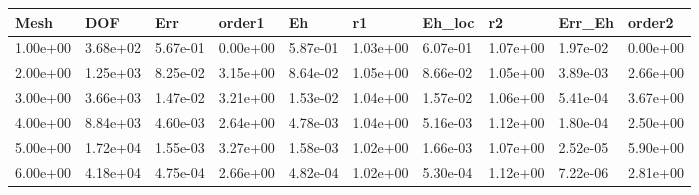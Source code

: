 \begin{tabular}{llllllllll}
Mesh & DOF & Err & order1 & Eh & r1 & Eh_loc & r2 & Err_Eh & order2 \\ 
\hline 
1.00e+00 & 3.68e+02 & 5.67e-01 & 0.00e+00 & 5.87e-01 & 1.03e+00 & 6.07e-01 & 1.07e+00 & 1.97e-02 & 0.00e+00 \\ 
2.00e+00 & 1.25e+03 & 8.25e-02 & 3.15e+00 & 8.64e-02 & 1.05e+00 & 8.66e-02 & 1.05e+00 & 3.89e-03 & 2.66e+00 \\ 
3.00e+00 & 3.66e+03 & 1.47e-02 & 3.21e+00 & 1.53e-02 & 1.04e+00 & 1.57e-02 & 1.06e+00 & 5.41e-04 & 3.67e+00 \\ 
4.00e+00 & 8.84e+03 & 4.60e-03 & 2.64e+00 & 4.78e-03 & 1.04e+00 & 5.16e-03 & 1.12e+00 & 1.80e-04 & 2.50e+00 \\ 
5.00e+00 & 1.72e+04 & 1.55e-03 & 3.27e+00 & 1.58e-03 & 1.02e+00 & 1.66e-03 & 1.07e+00 & 2.52e-05 & 5.90e+00 \\ 
6.00e+00 & 4.18e+04 & 4.75e-04 & 2.66e+00 & 4.82e-04 & 1.02e+00 & 5.30e-04 & 1.12e+00 & 7.22e-06 & 2.81e+00 \\ 
\hline 
\end{tabular}